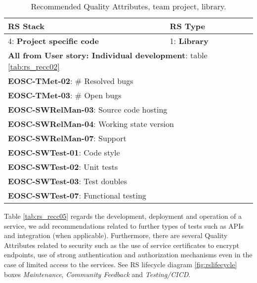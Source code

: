\begin{center}
\begin{table}
  \label{tab:rs_recc04}
  \small
  \begin{tabular}{|p{0.65\linewidth}|p{0.35\linewidth}|} \hline

    \textbf{RS Stack} & \textbf{RS Type} \\ \hline \hline
    4: \textbf{Project specific code} &
    1: \textbf{Library} \\ \hline \hline
    \multicolumn{2}{|l|}{\textbf{All from User story: Individual development}: table \ref{tab:rs_recc02}} \\ \hline
    \multicolumn{2}{|l|}{\textbf{EOSC-TMet-02}: \# Resolved bugs} \\ \hline
    \multicolumn{2}{|l|}{\textbf{EOSC-TMet-03}: \# Open bugs} \\ \hline
    \multicolumn{2}{|l|}{\textbf{EOSC-SWRelMan-03}: Source code hosting} \\ \hline
    \multicolumn{2}{|l|}{\textbf{EOSC-SWRelMan-04}: Working state version} \\ \hline
    \multicolumn{2}{|l|}{\textbf{EOSC-SWRelMan-07}: Support} \\ \hline
    \multicolumn{2}{|l|}{\textbf{EOSC-SWTest-01}: Code style} \\ \hline
    \multicolumn{2}{|l|}{\textbf{EOSC-SWTest-02}: Unit tests} \\ \hline
    \multicolumn{2}{|l|}{\textbf{EOSC-SWTest-03}: Test doubles} \\ \hline
    \multicolumn{2}{|l|}{\textbf{EOSC-SWTest-07}: Functional testing} \\ \hline

  \end{tabular}
  \caption{Recommended Quality Attributes, team project, library.}
\end{table}
\end{center}

Table \ref{tab:rs_recc05} regards the development, deployment and operation of a service, we add recommendations related to further types of tests such as APIs and integration (when applicable). Furthermore, there are several Quality Attributes related to security such as the use of service certificates to encrypt endpoints, use of strong authentication and authorization mechanisms even in the case of limited access to the services. See RS lifecycle diagram \ref{fig:rslifecycle} boxes \textit{Maintenance}, \textit{Community Feedback} and \textit{Testing/CICD}.

